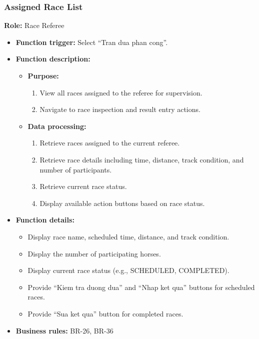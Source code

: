 
\subsubsection{Assigned Race List}

\textbf{Role:} Race Referee

\begin{itemize}
    \item \textbf{Function trigger:} Select ``Tran dua phan cong''.

    \item \textbf{Function description:}
    \begin{itemize}
        \item \textbf{Purpose:}
        \begin{enumerate}
            \item View all races assigned to the referee for supervision.
            \item Navigate to race inspection and result entry actions.
        \end{enumerate}

        \item \textbf{Data processing:}
        \begin{enumerate}
            \item Retrieve races assigned to the current referee.
            \item Retrieve race details including time, distance, track condition, and number of participants.
            \item Retrieve current race status.
            \item Display available action buttons based on race status.
        \end{enumerate}
    \end{itemize}

    \item \textbf{Function details:}
    \begin{itemize}
        \item Display race name, scheduled time, distance, and track condition.
        \item Display the number of participating horses.
        \item Display current race status (e.g., SCHEDULED, COMPLETED).
        \item Provide ``Kiem tra duong dua'' and ``Nhap ket qua'' buttons for scheduled races.
        \item Provide ``Sua ket qua'' button for completed races.
    \end{itemize}
    \item \textbf{Business rules:} BR-26, BR-36
\end{itemize}

